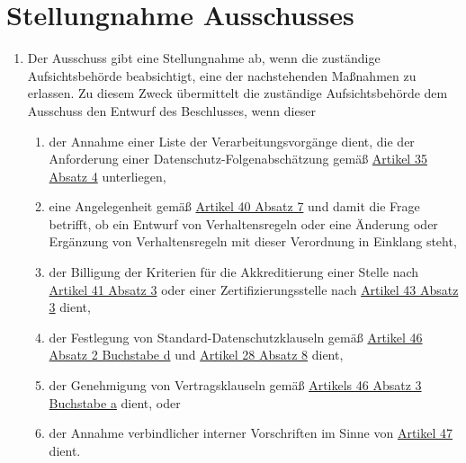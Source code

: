 \chapter{Stellungnahme Ausschusses}
\label{ch:64}


\begin{enumerate}

  \item Der Ausschuss gibt eine Stellungnahme ab, wenn die zuständige Aufsichtsbehörde beabsichtigt, eine der
   nachstehenden Maßnahmen zu erlassen. Zu diesem Zweck übermittelt die zuständige Aufsichtsbehörde dem Ausschuss den
   Entwurf des Beschlusses, wenn dieser
  \label{itm:64-1}

  \begin{enumerate}
  
    \item der Annahme einer Liste der Verarbeitungsvorgänge dient, die der Anforderung einer
     Datenschutz-Folgenabschätzung gemäß \hyperref[itm:35-4]{Artikel 35 Absatz 4} unterliegen,
    \label{itm:64-1a}

    \item eine Angelegenheit gemäß \hyperref[itm:40-7]{Artikel 40 Absatz 7} und damit die Frage betrifft, ob ein Entwurf
     von Verhaltensregeln oder eine Änderung oder Ergänzung von Verhaltensregeln mit dieser Verordnung in Einklang
     steht,
    \label{itm:64-1b}

    \item der Billigung der Kriterien für die Akkreditierung einer Stelle nach \hyperref[itm:41-3]{Artikel 41 Absatz 3}
     oder einer Zertifizierungsstelle nach \hyperref[itm:43-3]{Artikel 43 Absatz 3} dient,
    \label{itm:64-1c}

    \item der Festlegung von Standard-Datenschutzklauseln gemäß \hyperref[itm:46-2d]{Artikel 46 Absatz 2 Buchstabe d}
     und \hyperref[itm:28-8]{Artikel 28 Absatz 8} dient,
    \label{itm:64-1d}

    \item der Genehmigung von Vertragsklauseln gemäß \hyperref[itm:46-3a]{Artikels 46 Absatz 3 Buchstabe a} dient, oder
    \label{itm:64-1e}

    \item der Annahme verbindlicher interner Vorschriften im Sinne von \hyperref[ch:47]{Artikel 47} dient.
    \label{itm:64-1f}

  \end{enumerate}


\end{enumerate}
